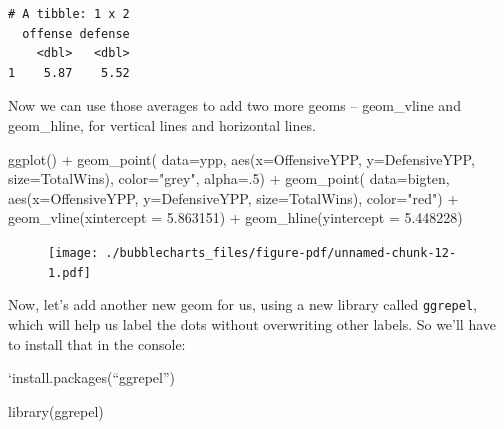 \documentclass[
  letterpaper,
  DIV=11,
  numbers=noendperiod]{scrreprt}
\newenvironment{Shaded}{\begin{snugshade}}{\end{snugshade}}
\newcommand{\AttributeTok}[1]{\textcolor[rgb]{0.40,0.45,0.13}{#1}}
\newcommand{\DecValTok}[1]{\textcolor[rgb]{0.68,0.00,0.00}{#1}}
\newcommand{\FloatTok}[1]{\textcolor[rgb]{0.68,0.00,0.00}{#1}}
\newcommand{\FunctionTok}[1]{\textcolor[rgb]{0.28,0.35,0.67}{#1}}
\newcommand{\NormalTok}[1]{\textcolor[rgb]{0.00,0.23,0.31}{#1}}
\newcommand{\SpecialCharTok}[1]{\textcolor[rgb]{0.37,0.37,0.37}{#1}}
\newcommand{\StringTok}[1]{\textcolor[rgb]{0.13,0.47,0.30}{#1}}
\begin{document}
\begin{verbatim}
# A tibble: 1 x 2
  offense defense
    <dbl>   <dbl>
1    5.87    5.52
\end{verbatim}

Now we can use those averages to add two more geoms -- geom\_vline and
geom\_hline, for vertical lines and horizontal lines.

\begin{Shaded}
\begin{Highlighting}[]
\FunctionTok{ggplot}\NormalTok{() }\SpecialCharTok{+} 
  \FunctionTok{geom\_point}\NormalTok{(}
    \AttributeTok{data=}\NormalTok{ypp, }
    \FunctionTok{aes}\NormalTok{(}\AttributeTok{x=}\NormalTok{OffensiveYPP, }\AttributeTok{y=}\NormalTok{DefensiveYPP, }\AttributeTok{size=}\NormalTok{TotalWins), }
    \AttributeTok{color=}\StringTok{"grey"}\NormalTok{, }
    \AttributeTok{alpha=}\NormalTok{.}\DecValTok{5}\NormalTok{) }\SpecialCharTok{+} 
  \FunctionTok{geom\_point}\NormalTok{(}
    \AttributeTok{data=}\NormalTok{bigten, }
    \FunctionTok{aes}\NormalTok{(}\AttributeTok{x=}\NormalTok{OffensiveYPP, }\AttributeTok{y=}\NormalTok{DefensiveYPP, }\AttributeTok{size=}\NormalTok{TotalWins), }
    \AttributeTok{color=}\StringTok{"red"}\NormalTok{) }\SpecialCharTok{+} 
  \FunctionTok{geom\_vline}\NormalTok{(}\AttributeTok{xintercept =} \FloatTok{5.863151}\NormalTok{) }\SpecialCharTok{+} 
  \FunctionTok{geom\_hline}\NormalTok{(}\AttributeTok{yintercept =} \FloatTok{5.448228}\NormalTok{)}
\end{Highlighting}
\end{Shaded}

\begin{figure}[H]

{\centering \texttt{[image: ./bubblecharts\_files/figure-pdf/unnamed-chunk-12-1.pdf]}

}

\end{figure}

Now, let's add another new geom for us, using a new library called
\texttt{ggrepel}, which will help us label the dots without overwriting
other labels. So we'll have to install that in the console:

`install.packages(``ggrepel'')

\begin{Shaded}
\begin{Highlighting}[]
\FunctionTok{library}\NormalTok{(ggrepel)}
\end{Highlighting}
\end{Shaded}
\end{document}
